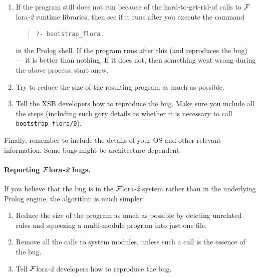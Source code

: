 \documentclass[11pt]{article}
\newcommand{\FLORA}{{\mbox{\sc ${\cal F}${lora}\rm\emph{-2}}}\xspace}
\newcommand{\FLSYSTEM}{\FLORA}
\newcommand{\FLBOOTSTRAP}{bootstrap\_flora}
\begin{document}
\begin{enumerate}
    Other calls that are often no longer needed in the dumped code are
    those that load \FLSYSTEM runtime libraries (which we are trying to
    eliminate!). These calls have the form
    \begin{verbatim}
   ?- flora_load_library(...).      
    \end{verbatim}
    If there are other calls to \FLSYSTEM runtime libraries, try to delete
    them, but make sure that the bug is still reproducible.
  \item If the program still does not run because of the hard-to-get-rid-of
    calls to \FLSYSTEM runtime libraries, then see if it runs after you
    execute the command
    \begin{quote}
       {\tt ?- \FLBOOTSTRAP.}      
    \end{quote}
    in the Prolog shell. If the program runs after this (and reproduces the
    bug) --- it is better than nothing. If it does not, then something went
    wrong during the above process: start anew.
  \item Try to reduce the size of the resulting program as much as possible.
  \item Tell the XSB developers how to reproduce the bug. Make sure you
    include all the steps (including such gory details as whether it is
    necessary to call {\tt \FLBOOTSTRAP/0}).
\end{enumerate}
Finally, remember to include the details of your OS and other relevant
information. Some bugs might be architecture-dependent.

\paragraph{Reporting \FLSYSTEM bugs.}
If you believe that the bug is in the \FLSYSTEM system rather than in the
underlying Prolog engine, the algorithm is much simpler: 
\begin{enumerate}
  \item Reduce the size of the program as much as possible by deleting 
    unrelated rules and squeezing a multi-module program into
    just one file.
  \item Remove all the calls to system modules, unless such a call is
    the essence of the bug.
  \item Tell \FLSYSTEM developers how to reproduce the bug.
\end{enumerate}
\end{document}
